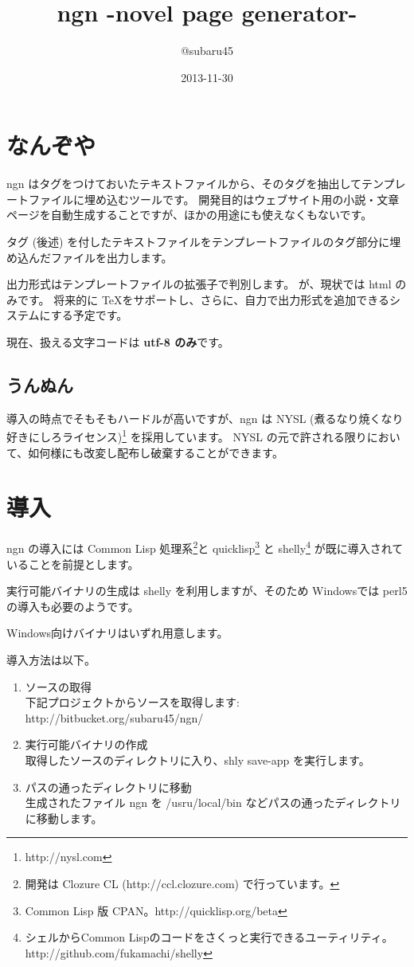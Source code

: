 \documentclass[a4j]{jsarticle}
\begin{document}
\title{ngn -novel page generator-}
\author{@subaru45}
\date{2013-11-30}
\maketitle


\section{なんぞや}
ngn はタグをつけておいたテキストファイルから、そのタグを抽出してテンプレートファイルに埋め込むツールです。
開発目的はウェブサイト用の小説・文章ページを自動生成することですが、ほかの用途にも使えなくもないです。

タグ (後述) を付したテキストファイルをテンプレートファイルのタグ部分に埋め込んだファイルを出力します。

出力形式はテンプレートファイルの拡張子で判別します。
が、現状では html のみです。
将来的に \TeX をサポートし、さらに、自力で出力形式を追加できるシステムにする予定です。

現在、扱える文字コードは \textbf{utf-8 のみ}です。

\subsection{うんぬん}
導入の時点でそもそもハードルが高いですが、ngn は NYSL (煮るなり焼くなり好きにしろライセンス)\footnote{http://nysl.com} を採用しています。
NYSL の元で許される限りにおいて、如何様にも改変し配布し破棄することができます。



\section{導入}
ngn の導入には Common Lisp 処理系\footnote{開発は Clozure CL (http://ccl.clozure.com) で行っています。}と quicklisp\footnote{Common Lisp 版 CPAN。http://quicklisp.org/beta}  と shelly\footnote{シェルからCommon Lispのコードをさくっと実行できるユーティリティ。http://github.com/fukamachi/shelly} が既に導入されていることを前提とします。

実行可能バイナリの生成は shelly を利用しますが、そのため Windowsでは perl5 の導入も必要のようです。

Windows向けバイナリはいずれ用意します。

導入方法は以下。
\begin{enumerate}
  \item ソースの取得 \\
    下記プロジェクトからソースを取得します: \\
    http://bitbucket.org/subaru45/ngn/

  \item 実行可能バイナリの作成 \\
    取得したソースのディレクトリに入り、shly save-app を実行します。

  \item パスの通ったディレクトリに移動 \\
    生成されたファイル ngn を /usru/local/bin などパスの通ったディレクトリに移動します。
\end{enumerate}
\end{document}

